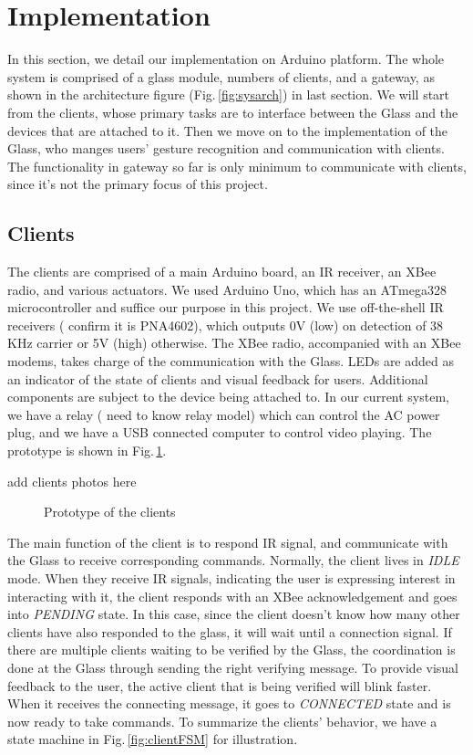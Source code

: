 \section{Implementation}
\label{sec:implementation}

In this section, we detail our implementation on Arduino \cite{Arduino} platform. The whole system is comprised of a glass module, numbers of clients, and a gateway, as shown in the architecture figure (Fig.\,\ref{fig:sysarch}) in last section. We will start from the clients, whose primary tasks are to interface between the Glass and the devices that are attached to it. Then we move on to the implementation of the Glass, who manges users' gesture recognition and communication with clients. The functionality in gateway so far is only minimum to communicate with clients, since it's not the primary focus of this project.

\subsection{Clients}
The clients are comprised of a main Arduino board, an IR receiver, an XBee radio, and various actuators. We used Arduino Uno, which has an ATmega328 microcontroller and suffice our purpose in this project. We use off-the-shell IR receivers ({\color{red} confirm it is PNA4602}), which outputs 0V (low) on detection of 38 KHz carrier or 5V (high) otherwise. The XBee radio, accompanied with an XBee modems, takes charge of the communication with the Glass. LEDs are added as an indicator of the state of clients and visual feedback for users. Additional components are subject to the device being attached to. In our current system, we have a relay ({\color{red} need to know relay model}) which can control the AC power plug, and we have a USB connected computer to control video playing. The prototype is shown in Fig.\,\ref{fig:client}.

{\color{red} add clients photos here}
\begin{figure}
  \centering
  \caption{Prototype of the clients}
  \label{fig:client}
\end{figure}


The main function of the client is to respond IR signal, and communicate with the Glass to receive corresponding commands. Normally, the client lives in {\it IDLE} mode. When they receive IR signals, indicating the user is expressing interest in interacting with it, the client responds with an XBee acknowledgement and goes into {\it PENDING} state. In this case, since the client doesn't know how many other clients have also responded to the glass, it will wait until a connection signal. If there are multiple clients waiting to be verified by the Glass, the coordination is done at the Glass through sending the right verifying message. To provide visual feedback to the user, the active client that is being verified will blink faster. When it receives the connecting message, it goes to {\it CONNECTED} state and is now ready to take commands. To summarize the clients' behavior, we have a state machine in Fig.\,\ref{fig:clientFSM} for illustration.


